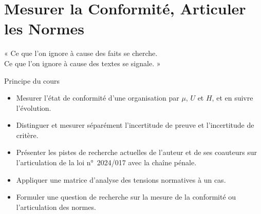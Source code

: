 
\chapter{Mesurer la Conformité, Articuler les Normes}
\label{chap:recherche}

\epigraph{%
    « Ce que l'on ignore à cause des faits se cherche.\\
    Ce que l'on ignore à cause des textes se signale. »%
}{Principe du cours}


\begin{boxobjectifs}
\begin{itemize}
    \item Mesurer l'état de conformité d'une organisation par $\mu$, $U$
          et $H$, et en suivre l'évolution.
    \item Distinguer et mesurer séparément l'incertitude de preuve et
          l'incertitude de critère.
    \item Présenter les pistes de recherche actuelles de l'auteur et de ses
          coauteurs sur l'articulation de la loi n°~2024/017 avec la chaîne
          pénale.
    \item Appliquer une matrice d'analyse des tensions normatives à un cas.
    \item Formuler une question de recherche sur la mesure de la
          conformité ou l'articulation des normes.
\end{itemize}
\end{boxobjectifs}

